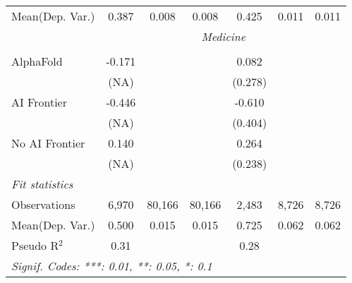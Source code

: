 \begin{tabular}{lcccccc}
Mean(Dep. Var.) & 0.387 & 0.008 & 0.008 & 0.425 & 0.011 & 0.011 \\
 & \multicolumn{6}{c}{\textit{Medicine}} \\ \\
   AlphaFold      & -0.171     &        &        & 0.082     &       &   \\   
                  & (NA)       &        &        & (0.278)   &       &   \\   
   AI Frontier    & -0.446     &        &        & -0.610    &       &   \\   
                  & (NA)       &        &        & (0.404)   &       &   \\   
   No AI Frontier & 0.140      &        &        & 0.264     &       &   \\   
                  & (NA)       &        &        & (0.238)   &       &   \\   
   \midrule
   \emph{Fit statistics}\\
   Observations   & 6,970      & 80,166 & 80,166 & 2,483     & 8,726 & 8,726\\  
Mean(Dep. Var.) & 0.500 & 0.015 & 0.015 & 0.725 & 0.062 & 0.062 \\
   Pseudo R$^2$   & 0.31       &        &        & 0.28      &       & \\  
   \midrule \midrule
   \multicolumn{7}{l}{\emph{Signif. Codes: ***: 0.01, **: 0.05, *: 0.1}}\\
\end{tabular}
\par\endgroup
